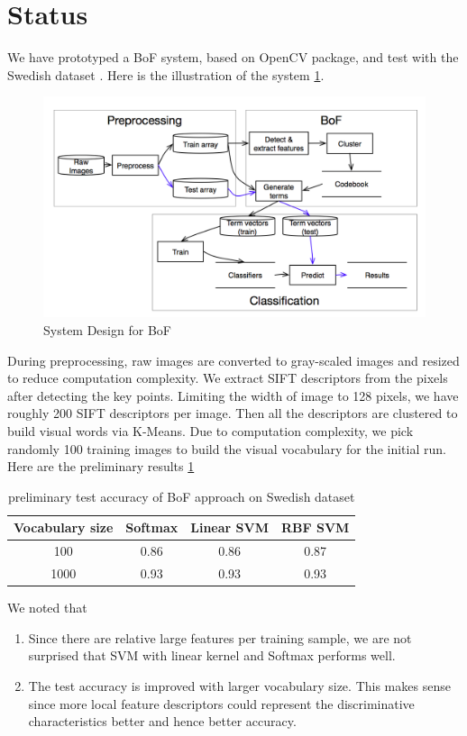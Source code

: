 \documentclass{article}
\begin{document}
\section{Status}
We have prototyped a BoF system, based on OpenCV package, and test with the Swedish dataset \cite{SwedishLeafDataset}. Here is the illustration of the system \ref{fig:bofsystemdesign}.
\begin{figure} 
  \centering
  \includegraphics[width=\textwidth]{flowchart}
  \caption{ System Design for BoF }
  \label{fig:bofsystemdesign}
\end{figure}
During preprocessing, raw images are converted to gray-scaled images and resized to reduce computation complexity. We extract SIFT descriptors from the pixels after detecting the key points. Limiting the width of image to 128 pixels, we have roughly 200 SIFT descriptors per image. Then all the descriptors are clustered to build visual words via K-Means. Due to computation complexity, we pick randomly 100 training images to build the visual vocabulary for the initial run.  Here are the preliminary results \ref{table:prelimaryresult}
\begin{table}
  \caption {preliminary test accuracy of BoF approach on Swedish dataset}
  \centering
  \begin{tabular} { c c c c}
    \hline\hline
    Vocabulary size & Softmax &  Linear SVM  & RBF SVM \\
    \hline
    100  &  0.86 & 0.86 & 0.87\\
    1000 &  0.93 & 0.93 & 0.93
  \end{tabular}
  \label{table:prelimaryresult}
\end{table}


We noted that
\begin{enumerate}
  \item Since there are relative large features per training sample, we are not surprised that SVM with linear kernel and Softmax performs well. 
  \item The test accuracy is improved with larger vocabulary size. This makes sense since more local feature descriptors could represent the discriminative characteristics better and hence better accuracy.
\end{enumerate}
\end{document}
